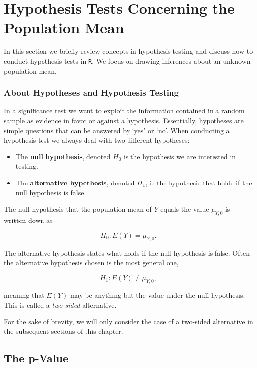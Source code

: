 \documentclass[]{book}
\theoremstyle{definition}
\theoremstyle{definition}
\theoremstyle{definition}
\theoremstyle{remark}
\begin{document}
\section{Hypothesis Tests Concerning the Population
Mean}\label{hypothesis-tests-concerning-the-population-mean}

In this section we briefly review concepts in hypothesis testing and
discuss how to conduct hypothesis tests in \texttt{R}. We focus on
drawing inferences about an unknown population mean.

\subsubsection*{About Hypotheses and Hypothesis
Testing}\label{about-hypotheses-and-hypothesis-testing}

In a significance test we want to exploit the information contained in a
random sample as evidence in favor or against a hypothesis. Essentially,
hypotheses are simple questions that can be answered by `yes' or `no'.
When conducting a hypothesis test we always deal with two different
hypotheses:

\begin{itemize}
\item
  The \textbf{null hypothesis}, denoted \(H_0\) is the hypothesis we are
  interested in testing.
\item
  The \textbf{alternative hypothesis}, denoted \(H_1\), is the
  hypothesis that holds if the null hypothesis is false.
\end{itemize}

The null hypothesis that the population mean of \(Y\) equals the value
\(\mu_{Y,0}\) is written down as

\[ H_0: E(Y) = \mu_{Y,0}. \]

The alternative hypothesis states what holds if the null hypothesis is
false. Often the alternative hypothesis chosen is the most general one,

\[ H_1: E(Y) \neq \mu_{Y,0}, \]

meaning that \(E(Y)\) may be anything but the value under the null
hypothesis. This is called a \emph{two-sided} alternative.

For the sake of brevity, we will only consider the case of a two-sided
alternative in the subsequent sections of this chapter.

\subsection*{The p-Value}\label{the-p-value}
\end{document}
